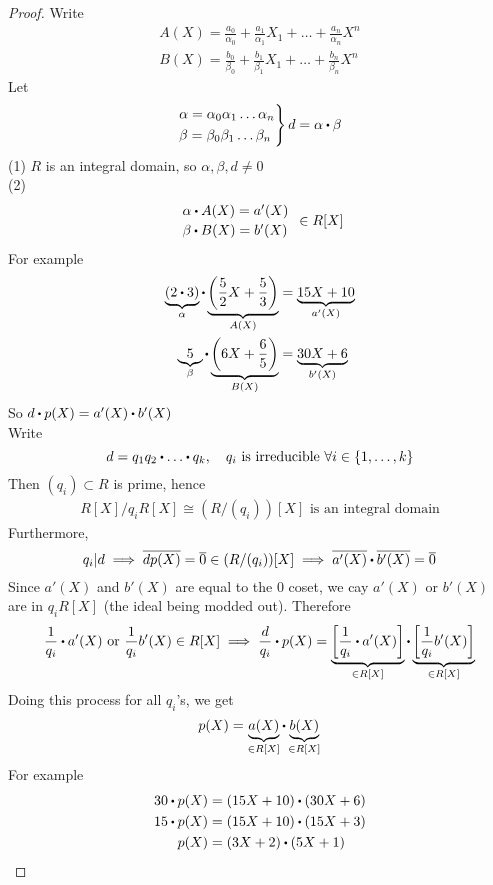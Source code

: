 \documentclass[../Main.tex]{subfiles}
\begin{document}
\begin{proof}
	Write
	\begin{align*}
	A(X)=\frac{a_0}{\alpha_0}+\frac{a_1}{\alpha_1}X_1+\dots +\frac{a_n}{\alpha_n}X^n\\
	B(X)= \frac{b_0}{\beta_0}+\frac{b_1}{\beta_1}X_1+\dots +\frac{b_n}{\beta_n}X^n
	\end{align*}
	Let 
	\[\begin{rcases*}
	\alpha = \alpha_0\alpha_1\dots\alpha_n\\
	\beta = \beta_0\beta_1\dots\beta_n
	\end{rcases*}d=\alpha\rdot \beta\]
	(1) $R$ is an integral domain, so $\alpha,\beta,d\ne 0$\\
	(2) 
	\[\begin{array}{l}
		\alpha\rdot A(X)=a'(X)\\[2pt]
		\beta\rdot B(X)=b'(X)
	\end{array}\in R[X]\]
	For example
	\begin{align*}
	\underbrace{(2\rdot 3)}_{\alpha}\rdot \underbrace{\left(\frac{5}{2}X+\frac{5}{3}\right)}_{A(X)}&=\underbrace{15X+10}_{a'(X)}\\ 
	\underbrace{5}_{\beta}\rdot \underbrace{\left(6X+\frac{6}{5}\right)}_{B(X)} &= \underbrace{30X+6}_{b'(X)}
	\end{align*}
	So $d\rdot p(X)=a'(X)\rdot b'(X)$\\
	Write
	\[d=q_1q_2\rdot \dots\rdot q_k,\quad q_i \text{ is irreducible }\forall i\in \{1,\dots,k\} \]
	Then $(q_i)\subset R$ is prime, hence
	\begin{align*}
	R[X]/q_iR[X] \cong (R/(q_i))[X] \text{ is an integral domain}
	\end{align*}
	Furthermore,
	\[q_i|d\implies \obar{dp(X)}=\obar{0} \in (R/(q_i))[X] \implies \obar{a'(X)}\rdot \obar{ b'(X)} =\obar{0}\]
	Since $a'(X)$ and $b'(X)$ are equal to the $0$ coset, we cay $a'(X)$ or $b'(X)$ are in $q_iR[X]$ (the ideal being modded out). Therefore
	\[\frac{1}{q_i}\rdot a'(X) \text{ or } \frac{1}{q_i}b'(X) \in R[X] \implies \frac{d}{q_i}\rdot p(X)=\underbrace{\left[\frac{1}{q_i}\rdot a'(X)\right]}_{\in R[X]}\rdot \underbrace{\left[\frac{1}{q_i}b'(X)\right]}_{\in R[X]} \]
	Doing this process for all $q_i$'s, we get
	\[p(X)=\underbrace{a(X)}_{\in R[X]}\rdot \underbrace{b(X)}_{\in R[X]}\]
	For example
	\begin{align*}
	30\rdot p(X)&=(15X+10)\rdot (30X+6)\\
	15\rdot p(X)&=(15X+10)\rdot (15X+3)\\
	p(X) &= (3X+2)\rdot (5X+1)\qedhere
	\end{align*}
\end{proof}
\end{document}
